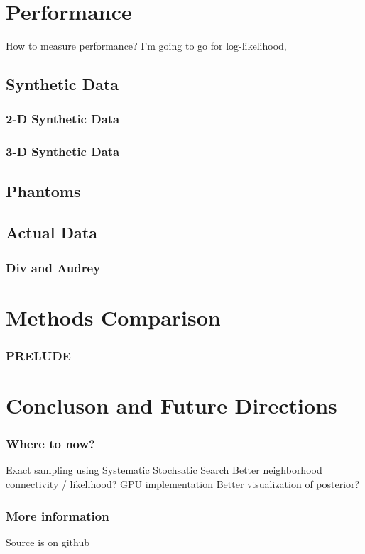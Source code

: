 \documentclass{beamer}
\begin{document}
\section{Performance}

How to measure performance? I'm going to go for 
log-likelihood, 

\subsection{Synthetic Data}
\begin{frame}
  \frametitle{2-D Synthetic Data}
\end{frame}

\begin{frame}
  \frametitle{3-D Synthetic Data}
\end{frame}

\subsection{Phantoms}

\subsection{Actual Data}
\begin{frame}
  \frametitle{Div and Audrey}
\end{frame}

\section{Methods Comparison}
\begin{frame}
  \frametitle{PRELUDE}
\end{frame}

\section{Concluson and Future Directions}
\begin{frame}
  \frametitle{Where to now?}
  Exact sampling using Systematic Stochsatic Search
  Better neighborhood connectivity / likelihood? 
  GPU implementation 
  Better visualization of posterior?
\end{frame}

\begin{frame}
  \frametitle{More information}
  Source is on github
  
\end{frame}
\end{document}
